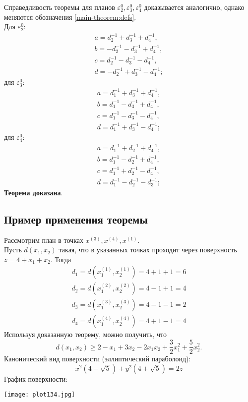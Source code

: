 Справедливость теоремы для планов $\varepsilon_2^0, \varepsilon_3^0,\varepsilon_4^0$ доказывается аналогично, однако меняются обозначения \eqref{main-theorem:defs}.\\ Для $\varepsilon_2^0$:
\begin{equation*} \begin{split}
a=d_2^{-1}+d_3^{-1}+d_4^{-1},\\
b=-d_2^{-1}-d_3^{-1}+d_4^{-1},\\
c=d_2^{-1}-d_3^{-1}-d_4^{-1},\\
d=-d_2^{-1}+d_3^{-1}-d_4^{-1};
\end{split}\end{equation*}
для $\varepsilon_3^0$:
\begin{equation*} \begin{split}
a=d_1^{-1}+d_3^{-1}+d_4^{-1},\\
b=d_1^{-1}-d_3^{-1}+d_4^{-1},\\
c=d_1^{-1}-d_3^{-1}-d_4^{-1},\\
d=d_1^{-1}+d_3^{-1}-d_4^{-1};
\end{split}\end{equation*}
для $\varepsilon_4^0$:
\begin{equation*} \begin{split}
a=d_1^{-1}+d_2^{-1}+d_4^{-1},\\
b=d_1^{-1}-d_2^{-1}+d_4^{-1},\\
c=d_1^{-1}+d_2^{-1}-d_4^{-1},\\
d=d_1^{-1}-d_2^{-1}-d_3^{-1};
\end{split}\end{equation*}
\textbf{Теорема доказана}.


\subsection{Пример применения теоремы}
Рассмотрим план в точках $x^{(3)}, x^{(4)}, x^{(1)}$.\\
Пусть $d(x_1, x_2)$ такая, что в указанных точках проходит через поверхность $z = 4 + x_1 + x_2$.
Тогда
\begin{gather*}
d_1 = d(x_1^{(1)}, x_2^{(1)}) = 4 + 1 + 1 = 6 \\
d_2 = d(x_1^{(2)}, x_2^{(2)}) = 4 -1 + 1 = 4 \\
d_3 = d(x_1^{(3)}, x_2^{(3)}) = 4 -1 - 1 = 2 \\
d_4 = d(x_1^{(4)}, x_2^{(4)}) = 4 + 1 - 1 = 4
\end{gather*}
Используя доказанную теорему, можно получить, что
$$d(x_1, x_2) \ge 2 - x_1 + 3x_2 -2x_1x_2 +\frac{3}{2}x_1^2 + \frac 5 2 x_2^2.$$
Канонический вид поверхности (эллиптический параболоид):\\
$$x^2 (4 - \sqrt{5}) + y^2 (4 + \sqrt 5) = 2z$$
График поверхности:\\
\begin{center}\texttt{[image: plot134.jpg]}\end{center}

